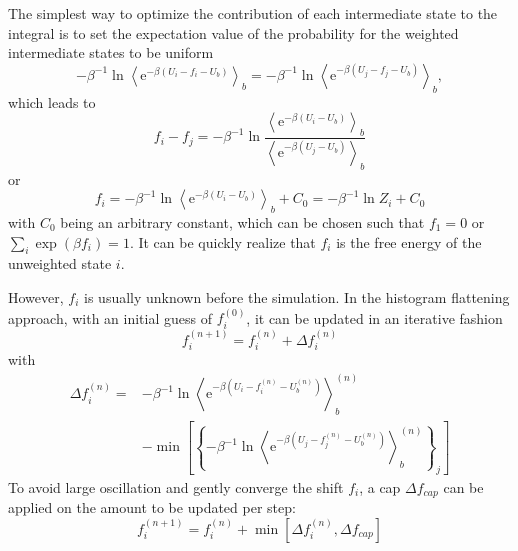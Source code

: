 The simplest way to optimize the contribution of each intermediate state to the integral is to set the expectation value of the probability for the weighted intermediate states to be uniform
\begin{equation}
	-\beta^{-1} \ln \left\langle \mathrm{e}^{-\beta\left(U_i-f_i-U_b\right)}\right\rangle_b=-\beta^{-1} \ln \left\langle\mathrm{e}^{-\beta\left(U_j-f_j-U_b\right)}\right\rangle_b,
\end{equation}
which leads to
\begin{equation}
	f_i-f_j=-\beta^{-1} \ln \frac{\left\langle\mathrm{e}^{-\beta\left(U_i-U_b\right)}\right\rangle_b}{\left\langle\mathrm{e}^{-\beta\left(U_j-U_b\right)}\right\rangle_b}
\end{equation}
or
\begin{equation}
	f_i=-\beta^{-1} \ln \left\langle\mathrm{e}^{-\beta\left(U_i-U_b\right)}\right\rangle_b+C_0=-\beta^{-1} \ln Z_i+C_0
\end{equation}
with $C_0$ being an arbitrary constant, which can be chosen such that $f_1=0$ or $\sum_i \exp(\beta f_i)=1$. It can be quickly realize that $f_i$ is the free energy of the unweighted state $i$.

However, $f_i$ is usually unknown before the simulation. In the histogram flattening approach, with an initial guess of $f_i^{(0)}$, it can be updated in an iterative fashion
\begin{equation}
	f_i^{(n+1)}=f_i^{(n)}+\Delta f_i^{(n)}
\end{equation}
with
\begin{equation}
	\begin{aligned}
		\Delta f_i^{(n)}= & -\beta^{-1} \ln \left\langle\mathrm{e}^{-\beta\left(U_i-f_i^{(n)}-U_b^{(n)}\right)}\right\rangle_b^{(n)} \\
		& -\min \left[\left\{-\beta^{-1} \ln \left\langle\mathrm{e}^{-\beta\left(U_j-f_j^{(n)}-U_b^{(n)}\right)}\right\rangle_b^{(n)}\right\}_j\right]
	\end{aligned}
\end{equation}
To avoid large oscillation and gently converge the shift $f_i$, a cap $\Delta f_{cap}$ can be applied on the amount to be updated per step:
\begin{equation}
	f_i^{(n+1)}=f_i^{(n)}+\min\left[\Delta f_i^{(n)},\Delta f_{cap}\right]
\end{equation}

